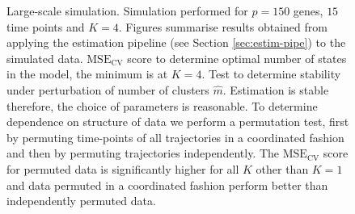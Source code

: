 \begin{figure}
  \centering
  \caption{Large-scale simulation. Simulation performed for $p=150$ genes, $15$ time points and $K=4$. Figures summarise results obtained from applying the estimation pipeline (see Section \ref{sec:estim-pipe}) to the simulated data.  $\mathrm{MSE_{CV}}$ score to determine optimal number of states in the model, the minimum is at $K = 4$.  Test to determine stability under perturbation of number of clusters $\hat{m}$. Estimation is stable therefore, the choice of parameters is reasonable.  To determine dependence on structure of data we perform a permutation test, first by permuting time-points of all trajectories in a coordinated fashion and then by permuting trajectories independently. The $\mathrm{MSE_{CV}}$ score for permuted data is significantly higher for all $K$ other than $K=1$ and data permuted in a coordinated fashion perform better than independently permuted data.}
  \label{fig:lrg-sim-k-m}
\end{figure}

